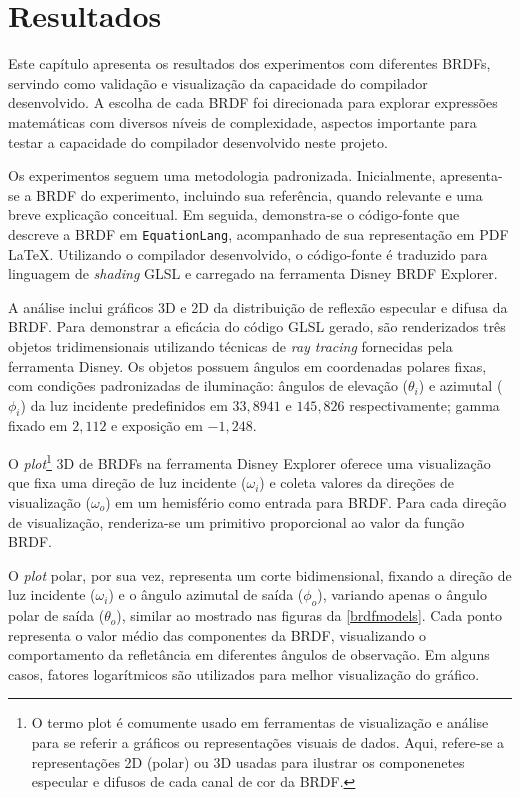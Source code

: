 \chapter{Resultados}
\label{chapter.resultados}


Este capítulo apresenta os resultados dos experimentos com diferentes BRDFs, servindo como validação e visualização da capacidade do compilador desenvolvido. A escolha de cada BRDF foi direcionada para explorar expressões matemáticas com diversos níveis de complexidade, aspectos importante para testar a capacidade do compilador desenvolvido neste projeto.

Os experimentos seguem uma metodologia padronizada. Inicialmente, apresenta-se a BRDF do experimento, incluindo sua referência, quando relevante e uma breve explicação conceitual. Em seguida, demonstra-se o código-fonte que descreve a BRDF em \texttt{EquationLang}, acompanhado de sua representação em PDF \LaTeX{}. Utilizando o compilador desenvolvido, o código-fonte é traduzido para linguagem de \textit{shading} GLSL e carregado na ferramenta Disney BRDF Explorer.

A análise inclui gráficos 3D e 2D da distribuição de reflexão especular e difusa da BRDF. Para demonstrar a eficácia do código GLSL gerado, são renderizados três objetos tridimensionais utilizando técnicas de \textit{ray tracing} fornecidas pela ferramenta Disney. Os objetos possuem ângulos em coordenadas polares fixas, com condições padronizadas de iluminação: ângulos de elevação ($\theta_i$) e azimutal ($\phi_i$) da luz incidente predefinidos em $33,8941$ e $145,826$ respectivamente; gamma fixado em $2,112$ e exposição em $-1,248$.

O \textit{plot}\footnote{O termo plot é comumente usado em ferramentas de visualização e análise para se referir a gráficos ou representações visuais de dados. Aqui, refere-se a representações 2D (polar) ou 3D usadas para ilustrar os componenetes especular e difusos de cada canal de cor da BRDF.} 3D de BRDFs na ferramenta Disney Explorer oferece uma visualização que fixa uma direção de luz incidente ($\omega_i$) e coleta valores da direções de visualização ($\omega_o$) em um hemisfério como entrada para BRDF. Para cada direção de visualização, renderiza-se um primitivo proporcional ao valor da função BRDF.

O \textit{plot} polar, por sua vez, representa um corte bidimensional, fixando a direção de luz incidente ($\omega_i$) e o ângulo azimutal de saída ($\phi_o$), variando apenas o ângulo polar de saída ($\theta_o$), similar ao mostrado nas figuras da \autoref{brdfmodels}. Cada ponto representa o valor médio das componentes da BRDF, visualizando o comportamento da refletância em diferentes ângulos de observação. Em alguns casos, fatores logarítmicos são utilizados para melhor visualização do gráfico.

